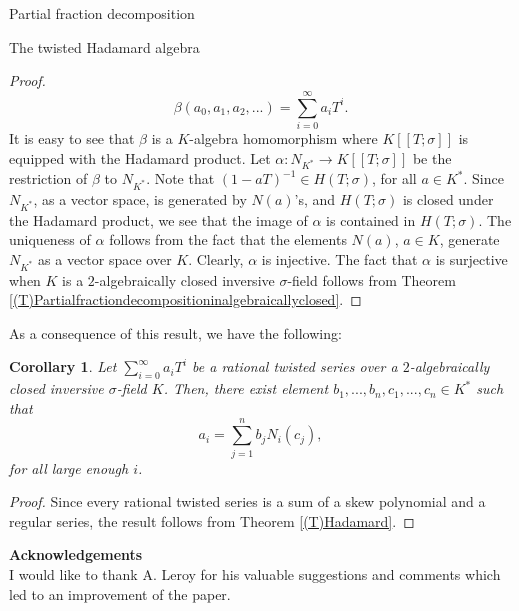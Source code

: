 \documentclass[11pt,a4paper]{article}
\theoremstyle{theorem}
\newtheorem{corollary}[theorem]{Corollary}
\numberwithin{equation}{section}
\newcommand{\s}{\sigma}
\begin{document}
\begin{section}{Partial fraction decomposition}
\begin{subsection}{The twisted Hadamard algebra}
\begin{proof}
		$$\beta(a_0,a_1,a_2,...)=\sum_{i=0}^\infty a_i T^i.$$
		It is easy to see that $\beta$ is a $K$-algebra homomorphism where $K[[T;\s]]$ is equipped with the Hadamard product. Let $\alpha:N_{K^*}\to K[[T;\s]]$ be the restriction of $\beta$ to $N_{K^*}$.  Note that $(1-aT)^{-1}\in H(T;\s)$, for all $a\in K^*$. Since  $N_{K^*}$, as a vector space, is generated by $N(a)$'s, and $H(T;\s)$ is closed under the Hadamard product, we see that the image of $\alpha$ is contained in $H(T;\s)$. The uniqueness of $\alpha$ follows from the fact that the elements $N(a)$, $a\in K$, generate $N_{K^*}$ as a vector space over $K$. Clearly, $\alpha$ is injective. The fact that $\alpha$ is surjective when $K$ is a $2$-algebraically closed inversive $\s$-field follows from Theorem  \ref{(T)Partialfractiondecompositioninalgebraicallyclosed}.      
		
	\end{proof}
	As a consequence of this result, we have the following:
	\begin{corollary}
		Let $\sum_{i=0}^{\infty}a_iT^i$ be a rational twisted series over a $2$-algebraically closed inversive $\s$-field $K$. Then, there exist element  $b_1,...,b_n,c_1,...,c_n\in K^*$ such that 
		$$a_i=\sum_{j=1}^n b_jN_i(c_j),$$
		for all large enough $i$. 		
	\end{corollary}
	\begin{proof}
		Since every rational twisted series is a sum of a skew polynomial and a regular series, the result follows from Theorem \ref{(T)Hadamard}. 
	\end{proof}
	
\end{subsection}
\textbf{Acknowledgements}\\
I would like to thank A. Leroy for
his valuable suggestions and comments which led to an improvement of the paper.
\end{section}
\end{document}
